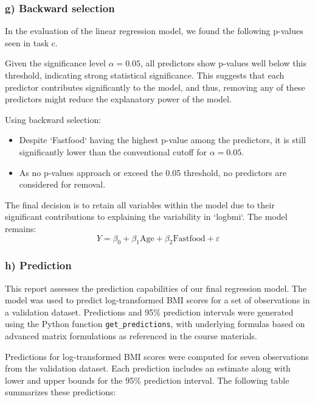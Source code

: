 \documentclass{rapport}
\begin{document}
\subsubsection*{\textbf{g)} Backward selection}
\noindent
In the evaluation of the linear regression model, we found the following p-values seen in task c. 

\noindent
Given the significance level \(\alpha = 0.05\), all predictors show p-values well below this threshold, indicating strong statistical significance. This suggests that each predictor contributes significantly to the model, and thus, removing any of these predictors might reduce the explanatory power of the model.

\noindent
Using backward selection:
\begin{itemize}
    \item Despite `Fastfood` having the highest p-value among the predictors, it is still significantly lower than the conventional cutoff for \(\alpha = 0.05\).
    \item As no p-values approach or exceed the 0.05 threshold, no predictors are considered for removal.
\end{itemize}

\noindent
The final decision is to retain all variables within the model due to their significant contributions to explaining the variability in `logbmi`. The model remains:
\[
Y = \beta_0 + \beta_1 \text{Age} + \beta_2 \text{Fastfood} + \varepsilon
\]


\subsubsection*{\textbf{h)} Prediction}
\noindent
This report assesses the prediction capabilities of our final regression model. The model was used to predict log-transformed BMI scores for a set of observations in a validation dataset. Predictions and 95\% prediction intervals were generated using the Python function \texttt{get\_predictions}, with underlying formulas based on advanced matrix formulations as referenced in the course materials.


\noindent
Predictions for log-transformed BMI scores were computed for seven observations from the validation dataset. Each prediction includes an estimate along with lower and upper bounds for the 95\% prediction interval. The following table summarizes these predictions:
\end{document}
